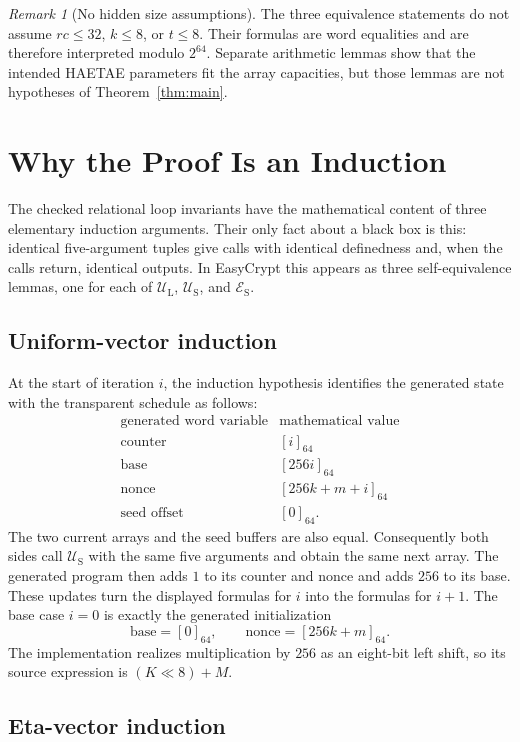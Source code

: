 \documentclass[11pt]{article}
\theoremstyle{definition}
\theoremstyle{plain}
\theoremstyle{remark}
\newtheorem*{remark}{Remark}
\newcommand{\enc}[1]{\left[#1\right]_{64}}
\newcommand{\UL}{\mathcal U_{\mathrm L}}
\newcommand{\US}{\mathcal U_{\mathrm S}}
\newcommand{\ES}{\mathcal E_{\mathrm S}}
\begin{document}
\begin{remark}[No hidden size assumptions]
The three equivalence statements do not assume $rc\le32$, $k\le8$, or
$t\le8$.  Their formulas are word equalities and are therefore interpreted
modulo $2^{64}$.  Separate arithmetic lemmas show that the intended HAETAE
parameters fit the array capacities, but those lemmas are not hypotheses of
Theorem~\ref{thm:main}.
\end{remark}

\section{Why the Proof Is an Induction}

The checked relational loop invariants have the mathematical content of three
elementary induction arguments.  Their only fact about a black box is this:
identical five-argument tuples give calls with identical definedness and, when
the calls return, identical outputs.  In EasyCrypt this appears as three
self-equivalence lemmas, one for each of $\UL$, $\US$, and $\ES$.

\subsection{Uniform-vector induction}

At the start of iteration $i$, the induction hypothesis identifies the
generated state with the transparent schedule as follows:
\[
\begin{array}{c|c}
\text{generated word variable} & \text{mathematical value} \\
\hline
\text{counter} & \enc{i} \\
\text{base} & \enc{256i} \\
\text{nonce} & \enc{256k+m+i} \\
\text{seed offset} & \enc{0}.
\end{array}
\]
The two current arrays and the seed buffers are also equal.  Consequently both
sides call $\US$ with the same five arguments and obtain the same next array.
The generated program then adds $1$ to its counter and nonce and adds $256$ to
its base.  These updates turn the displayed formulas for $i$ into the formulas
for $i+1$.  The base case $i=0$ is exactly the generated initialization
\[
  \text{base}=\enc{0},\qquad \text{nonce}=\enc{256k+m}.
\]
The implementation realizes multiplication by $256$ as an eight-bit left
shift, so its source expression is $(K\ll8)+M$.

\subsection{Eta-vector induction}
\end{document}
